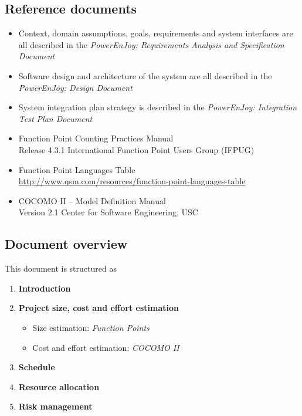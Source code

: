 \subsection{Reference documents}
\begin{itemize}
\item Context, domain assumptions, goals, requirements and system interfaces are all described in the \emph{PowerEnJoy: Requirements Analysis and Specification Document} \cite{RASD}
\item Software design and architecture of the system are all described in the \emph{PowerEnJoy: Design Document} \cite{DD}
\item System integration plan strategy is described in the \emph{PowerEnJoy: Integration Test Plan Document} \cite{ITPD}
\item Function Point Counting Practices Manual \\ 
Release 4.3.1 International Function Point Users Group (IFPUG)
\item Function Point Languages Table \\ 
\url{http://www.qsm.com/resources/function-point-languages-table}
\item COCOMO II – Model Definition Manual \\
Version 2.1 Center for Software Engineering, USC

\end{itemize}


\subsection{Document overview}
This document is structured as
\begin{enumerate}
	\item \textbf{Introduction}
	\item \textbf{Project size, cost and effort estimation}
	\begin{itemize}
		\item Size estimation: \emph{Function Points}
		\item Cost and effort estimation: \emph{COCOMO II}
	\end{itemize}
	\item \textbf{Schedule}
	\item \textbf{Resource allocation}
	\item \textbf{Risk management}
\end{enumerate}